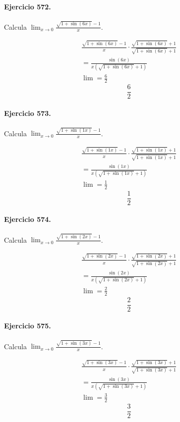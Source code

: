 \documentclass[11pt,a4paper]{article}
\begin{document}
\paragraph{Ejercicio 572.} Calcula $\displaystyle\lim_{x\to0}\frac{\sqrt{1+\sin(6x)}-1}{x}$.

\[
\begin{aligned}
\frac{\sqrt{1+\sin(6x)}-1}{x}\cdot \frac{\sqrt{1+\sin(6x)}+1}{\sqrt{1+\sin(6x)}+1}\\
=\frac{\sin(6x)}{x(\sqrt{1+\sin(6x)}+1)}\\
\lim=\frac{6}{2}
\end{aligned}
\]
\[\boxed{\frac{6}{2}}\]


\paragraph{Ejercicio 573.} Calcula $\displaystyle\lim_{x\to0}\frac{\sqrt{1+\sin(1x)}-1}{x}$.

\[
\begin{aligned}
\frac{\sqrt{1+\sin(1x)}-1}{x}\cdot \frac{\sqrt{1+\sin(1x)}+1}{\sqrt{1+\sin(1x)}+1}\\
=\frac{\sin(1x)}{x(\sqrt{1+\sin(1x)}+1)}\\
\lim=\frac{1}{2}
\end{aligned}
\]
\[\boxed{\frac{1}{2}}\]


\paragraph{Ejercicio 574.} Calcula $\displaystyle\lim_{x\to0}\frac{\sqrt{1+\sin(2x)}-1}{x}$.

\[
\begin{aligned}
\frac{\sqrt{1+\sin(2x)}-1}{x}\cdot \frac{\sqrt{1+\sin(2x)}+1}{\sqrt{1+\sin(2x)}+1}\\
=\frac{\sin(2x)}{x(\sqrt{1+\sin(2x)}+1)}\\
\lim=\frac{2}{2}
\end{aligned}
\]
\[\boxed{\frac{2}{2}}\]


\paragraph{Ejercicio 575.} Calcula $\displaystyle\lim_{x\to0}\frac{\sqrt{1+\sin(3x)}-1}{x}$.

\[
\begin{aligned}
\frac{\sqrt{1+\sin(3x)}-1}{x}\cdot \frac{\sqrt{1+\sin(3x)}+1}{\sqrt{1+\sin(3x)}+1}\\
=\frac{\sin(3x)}{x(\sqrt{1+\sin(3x)}+1)}\\
\lim=\frac{3}{2}
\end{aligned}
\]
\[\boxed{\frac{3}{2}}\]
\end{document}
